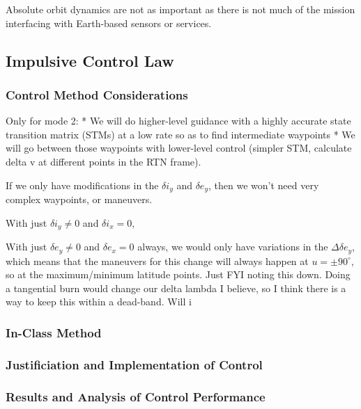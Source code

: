 Absolute orbit dynamics are not as important as there is not much of the mission interfacing with Earth-based sensors or services. 



\subsection{Impulsive Control Law}

\subsubsection{Control Method Considerations}

Only for mode 2:
* We will do higher-level guidance with a highly accurate state transition matrix (STMs) at a low rate so as to find intermediate waypoints
* We will go between those waypoints with lower-level control (simpler STM, calculate delta v at different points in the RTN frame).

If we only have modifications in the $\delta i_y$ and $\delta e_y$, then we won't need very complex waypoints, or maneuvers.

With just $\delta i_y \neq 0$ and $\delta i_x = 0$, 

With just $\delta e_y \neq 0$ and $\delta e_x = 0$ always, we would only have variations in the $\Delta \delta e_y$, which means that the maneuvers for this change will always happen at $u = \pm 90^\circ$, so at the maximum/minimum latitude points. Just FYI noting this down.
     Doing a tangential burn would change our delta lambda I believe, so I think there is a way to keep this within a dead-band.
     Will i 



\subsubsection{In-Class Method}

\subsubsection{Justificiation and Implementation of Control}

\subsubsection{Results and Analysis of Control Performance}
